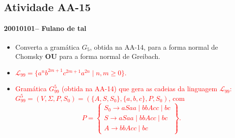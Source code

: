 \documentclass[12pt]{article}
\def\discente{Fulano de tal}
\def\matricula{20010101}
\def\aa{15}
\def\myling{{99}} %
\begin{document}
\subsection*{Atividade AA-\aa}
 \paragraph{\matricula -- \discente}
%
 \begin{itemize}
  \item Converta a gramática $G_5$, obtida na AA-14, para a forma normal de Chomsky \textbf{OU} para a forma normal de Greibach.
  
  \item \textcolor{red}{$\mathcal{L}_{\myling} = \{a^nb^{2m+1}c^{2m+1}a^{2n} \mid n,m \geqslant 0\}$.}
  \item  \textcolor{red}{Gramática $G_{\myling}^5$ (obtida na AA-14) que gera as cadeias da linguagem $\mathcal{L}_{\myling}$:\\
  $G_{\myling}^5=(V,\Sigma,P,S_0)=(\{A,S,S_0\},\{a,b,c\},P,S_0)$, com
    $$
     P =
     \left\{\begin{array}{l}
      S_0\to aSaa\mid bbAcc\mid bc\\
      S\to aSaa\mid bbAcc\mid bc\\
      A\to bbAcc\mid bc
     \end{array}\right\}.
    $$
  }
\end{itemize}
\end{document}

